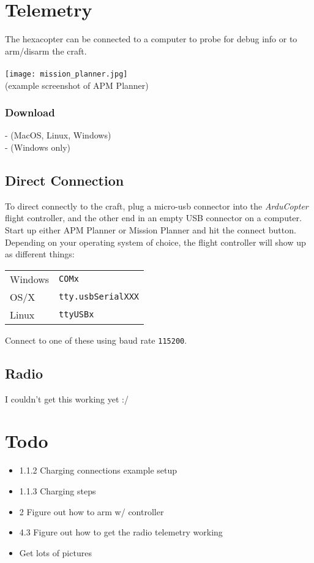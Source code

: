 \documentclass{style}
\begin{document}
\section{Telemetry}
The hexacopter can be connected to a computer to probe for debug info or to arm/disarm the craft. \\ \\
\texttt{[image: mission\_planner.jpg]} \\
(example screenshot of APM Planner)
\subsubsection{Download}
 - (MacOS, Linux, Windows) \\
 - (Windows only)
\subsection{Direct Connection}
To direct connectly to the craft, plug a micro-usb connector into the \textit{ArduCopter} flight controller, and the other end in an empty USB connector on a computer.
Start up either APM Planner or Mission Planner and hit the connect button.
Depending on your operating system of choice, the flight controller will show up as different things:
\newline
\newline
\begin{tabular}{ l l }
  Windows & \texttt{COMx} \\
  OS/X & \texttt{tty.usbSerialXXX} \\
  Linux & \texttt{ttyUSBx}
\end{tabular}
\newline
\newline
Connect to one of these using baud rate \texttt{115200}.
\subsection{Radio}
I couldn't get this working yet :/
\pagebreak
\section{Todo}
\begin{itemize}
\item 1.1.2 Charging connections example setup
\item 1.1.3 Charging steps
\item 2 Figure out how to arm w/ controller
\item 4.3 Figure out how to get the radio telemetry working
\item Get lots of pictures
\end{itemize}
\end{document}
